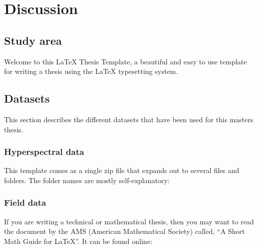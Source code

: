 



\chapter{Discussion} %
\label{Chapter4}





\section{Study area}
Welcome to this \LaTeX{} Thesis Template, a beautiful and easy to use template for writing a thesis using the \LaTeX{} typesetting system.


\section{Datasets}

This section describes the different datasets that have been used for this masters thesis.

\subsection{Hyperspectral data}

This template comes as a single zip file that expands out to several files and folders. The folder names are mostly self-explanatory:

\subsection{Field data}

If you are writing a technical or mathematical thesis, then you may want to read the document by the AMS (American Mathematical Society) called, \enquote{A Short Math Guide for \LaTeX{}}. It can be found online:


